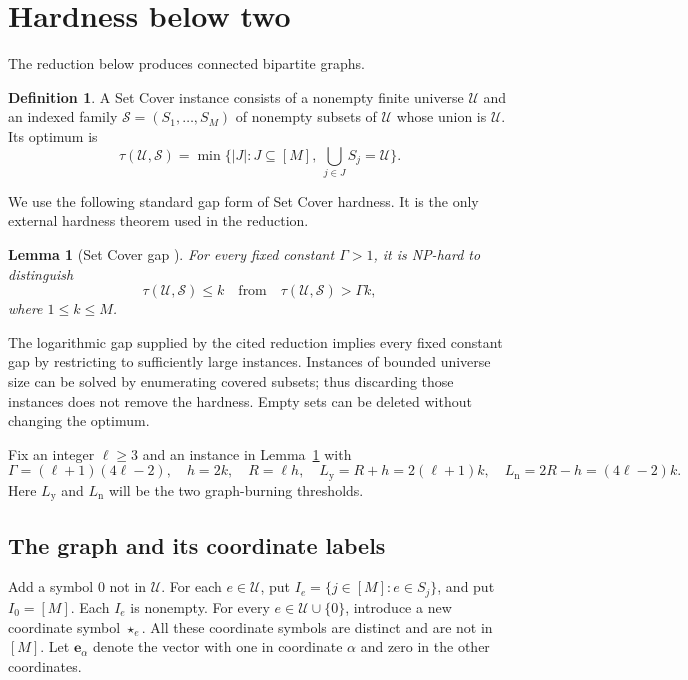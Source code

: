 \documentclass[11pt]{article}
\numberwithin{equation}{section}
\newtheorem{lemma}[theorem]{Lemma}
\theoremstyle{definition}
\newtheorem{definition}[theorem]{Definition}
\begin{document}
\section{Hardness below two}\label{sec:hardness}

The reduction below produces connected bipartite graphs.

\begin{definition}
A Set Cover instance consists of a nonempty finite universe
$\mathcal U$ and an indexed family
$\mathcal S=(S_1,\ldots,S_M)$ of nonempty subsets of $\mathcal U$ whose
union is $\mathcal U$. Its optimum is
\[
 \tau(\mathcal U,\mathcal S)
 =\min\{|J|:J\subseteq[M],\ \bigcup_{j\in J}S_j=\mathcal U\}.
\]
\end{definition}

We use the following standard gap form of Set Cover hardness. It is the
only external hardness theorem used in the reduction.

\begin{lemma}[Set Cover gap {\cite[Corollary 1.5 and Section 6.2]{DS}}]
\label{lem:set-cover-gap}
For every fixed constant $\Gamma>1$, it is NP-hard to distinguish
\[
 \tau(\mathcal U,\mathcal S)\le k
 \quad\text{from}\quad
 \tau(\mathcal U,\mathcal S)>\Gamma k,
\]
where $1\le k\le M$.
\end{lemma}
The logarithmic gap supplied by the cited reduction implies every fixed
constant gap by restricting to sufficiently large instances. Instances
of bounded universe size can be solved by enumerating covered subsets;
thus discarding those instances does not remove the hardness. Empty
sets can be deleted without changing the optimum.

Fix an integer $\ell\ge3$ and an instance in
Lemma~\ref{lem:set-cover-gap} with
\begin{equation}\label{eq:hardness-constants}
 \Gamma=(\ell+1)(4\ell-2),\quad
 h=2k,\quad R=\ell h,\quad
 L_{\mathrm y}=R+h=2(\ell+1)k,\quad
 L_{\mathrm n}=2R-h=(4\ell-2)k.
\end{equation}
Here $L_{\mathrm y}$ and $L_{\mathrm n}$ will be the two graph-burning
thresholds.

\subsection{The graph and its coordinate labels}

Add a symbol $0$ not in $\mathcal U$. For each $e\in\mathcal U$, put
$I_e=\{j\in[M]:e\in S_j\}$, and put $I_0=[M]$. Each $I_e$ is nonempty.
For every $e\in\mathcal U\cup\{0\}$, introduce a new coordinate symbol
$\star_e$. All these coordinate symbols are distinct and are not in
$[M]$. Let $\mathbf e_\alpha$ denote the vector with one in coordinate
$\alpha$ and zero in the other coordinates.
\end{document}
